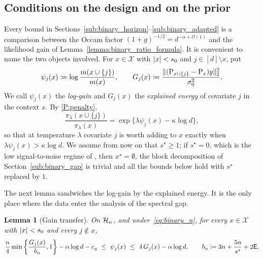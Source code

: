 \documentclass[aos]{imsart}%
\DeclarePairedDelimiter{\norm}{\lVert}{\rVert}
\DeclarePairedDelimiter{\abs}{\lvert}{\rvert}
\newcommand{\ambientspace}[0]{\mathcal{X}}
\newcommand{\OO}{\mathcal{O}}  %
\theoremstyle{plain}
\newtheorem{lemma}[theorem]{Lemma}
\theoremstyle{definition}
\begin{document}
    \subsection{Conditions on the design and on the prior}
    \label{sub:binary_null}

    Every bound in Sections~\ref{sub:binary_horizon}--\ref{sub:binary_adapted}
    is a comparison between the Occam factor $(1+g)^{-1/2}=d^{-\alpha+\OO(1)}$
    and the likelihood gain of Lemma~\ref{lemma:binary_ratio_formula}. It is
    convenient to name the two objects involved. For $x\in\ambientspace$ with
    $\abs x<s_0$ and $j\in[d]\setminus x$, put
    \begin{equation}
        \label{eq:binary_psi_G}
        \psi_j(x)\coloneq\log\frac{m(x\cup\{j\})}{m(x)},
        \qquad
        G_j(x)\coloneq\frac{\norm{(\Proj_{x\cup\{j\}}-\Proj_x)y}_2^{2}}
        {\sigma_0^{2}} .
    \end{equation}
    We call $\psi_j(x)$ the \emph{log-gain} and $G_j(x)$ the
    \emph{explained energy} of covariate $j$ in the context $x$. By
    \ref{P:penalty},
    \begin{equation}
        \label{eq:binary_onestep_psi}
        \frac{\pi_\lambda(x\cup\{j\})}{\pi_\lambda(x)}
        =\exp\bigl\{\lambda\psi_j(x)-\kappa\log d\bigr\},
    \end{equation}
    so that at temperature $\lambda$ covariate $j$ is worth adding to $x$
    exactly when $\lambda\psi_j(x)>\kappa\log d$. We assume from now on that
    $s^{\star}\geq1$; if $s^{\star}=0$, which is the low signal-to-noise regime
    of \citet{YangWainwrightJordan2016}, then $x^\star=\emptyset$, the block
    decomposition of Section~\ref{sub:binary_gap} is trivial and all the bounds
    below hold with $s^{\star}$ replaced by $1$.

    The next lemma sandwiches the log-gain by the explained energy. It is the
    only place where the data enter the analysis of the spectral gap.

    \begin{lemma}[Gain transfer]
        \label{lemma:binary_transfer}
        On $\mathcal{H}_n$, and under~\eqref{eq:binary_n}, for every
        $x\in\ambientspace$ with $\abs x<s_0$ and every $j\notin x$,
        \begin{equation}
            \label{eq:binary_transfer}
            \frac n4\min\left\{\frac{G_j(x)}{b_n},1\right\}
            -\alpha\log d-c_g
            \ \leq\ \psi_j(x)\ \leq\ 4\,G_j(x)-\alpha\log d ,
            \qquad
            b_n\coloneq3n+\frac{5n}{s^{\star}}+2\mathsf{E} .
        \end{equation}
    \end{lemma}
\end{document}
